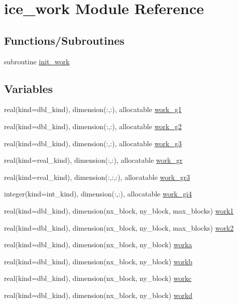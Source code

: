 \hypertarget{namespaceice__work}{
\section{ice\_\-work Module Reference}
\label{namespaceice__work}
}
\subsection*{Functions/Subroutines}
\begin{DoxyCompactItemize}
\item 
subroutine \hyperlink{namespaceice__work_af0fa69c909e63b58400ba8f31ab81a4b}{init\_\-work}
\end{DoxyCompactItemize}
\subsection*{Variables}
\begin{DoxyCompactItemize}
\item 
real(kind=dbl\_\-kind), dimension(:,:), allocatable \hyperlink{namespaceice__work_a6feb68d353a0240588d528748fecab4c}{work\_\-g1}
\item 
real(kind=dbl\_\-kind), dimension(:,:), allocatable \hyperlink{namespaceice__work_abfbbe39f5e047d0db457513d4f779e15}{work\_\-g2}
\item 
real(kind=dbl\_\-kind), dimension(:,:), allocatable \hyperlink{namespaceice__work_a929bf2491f92c1f877144e7551e715b2}{work\_\-g3}
\item 
real(kind=real\_\-kind), dimension(:,:), allocatable \hyperlink{namespaceice__work_aac80d822929fda3078c9f14d2232e309}{work\_\-gr}
\item 
real(kind=real\_\-kind), dimension(:,:,:), allocatable \hyperlink{namespaceice__work_a0891f9d671557b4379b9685923a8b4b2}{work\_\-gr3}
\item 
integer(kind=int\_\-kind), dimension(:,:), allocatable \hyperlink{namespaceice__work_af91dc6e8e0c9382cf3f2a9b6e5cd8f05}{work\_\-gi4}
\item 
real(kind=dbl\_\-kind), dimension(nx\_\-block, ny\_\-block, max\_\-blocks) \hyperlink{namespaceice__work_a5099225ca0b3af312ef912afa606cbce}{work1}
\item 
real(kind=dbl\_\-kind), dimension(nx\_\-block, ny\_\-block, max\_\-blocks) \hyperlink{namespaceice__work_af68c18020956e2cb0b298ccb87d24ece}{work2}
\item 
real(kind=dbl\_\-kind), dimension(nx\_\-block, ny\_\-block) \hyperlink{namespaceice__work_aa80691ca530fe4509dd7271288a7b2b8}{worka}
\item 
real(kind=dbl\_\-kind), dimension(nx\_\-block, ny\_\-block) \hyperlink{namespaceice__work_a380e9742bb40ec20a9fd1c2ac2995c2f}{workb}
\item 
real(kind=dbl\_\-kind), dimension(nx\_\-block, ny\_\-block) \hyperlink{namespaceice__work_aac3c0417ddea094a63ce0e98fc0b2a82}{workc}
\item 
real(kind=dbl\_\-kind), dimension(nx\_\-block, ny\_\-block) \hyperlink{namespaceice__work_acd825d38351494ad264a79c5795e4769}{workd}
\end{DoxyCompactItemize}


